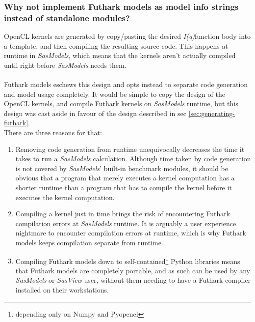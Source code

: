\documentclass[11pt]{article}
\newcommand{\sasmodels}{\textit{SasModels}}
\newcommand{\sasview}{\textit{SasView}}
\newcommand{\iq}{\textit{I(q)}}
\begin{document}
\subsubsection{Why not implement Futhark models as model info strings 
instead of standalone modules?}
OpenCL kernels are generated by copy/pasting the desired \iq function body
into a template, and then compiling the resulting source code.
This happens at runtime in \sasmodels, which means that the kernels aren't
 actually compiled until right before \sasmodels{} needs them.
\\\\
Futhark models eschews this design and opts instead to separate code generation
and model usage completely.
It would be simple to copy the design of the OpenCL kernels, and compile Futhark
kernels on \sasmodels{} runtime, but this design was cast aside in favour of the
design described in sec \ref{sec:generating-futhark}.
\\
There are three reasons for that:
\begin{enumerate}
  \item Removing code generation from runtime unequivocally decreases the time
  it takes to run a \sasmodels{} calculation. Although time taken by code 
  generation is not covered by \sasmodels' built-in benchmark modules, it should
  be obvious that a program that merely executes a kernel computation has a 
  shorter runtime than a program that has to compile the kernel before it
  executes the kernel computation.
  
  \item Compiling a kernel just in time brings the risk of encountering 
  Futhark compilation errors at \sasmodels{} runtime. 
  It is arguably a user experience nightmare to encounter compilation errors at 
  runtime, which is why Futhark models keeps compilation separate from runtime.
  
  \item Compiling Futhark models down to self-contained\footnote{depending only 
  on Numpy and Pyopencl} Python libraries means that Futhark models are 
  completely portable, and as such can be used by any \sasmodels{} or \sasview{} 
  user, without them needing to have a Futhark compiler installed on their 
  workstations.
\end{enumerate}
\end{document}
